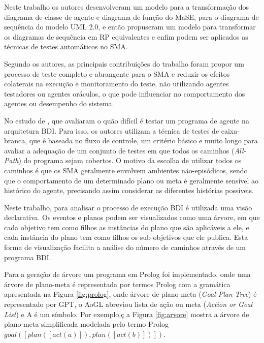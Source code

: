 Neste trabalho os autores desenvolveram um modelo para a transformação dos diagrama de classe de agente e diagrama de função do MaSE, para o diagrama de sequência do modelo UML 2.0, e então propuseram um modelo para transformar os diagramas de sequência em RP equivalentes e enfim podem ser aplicados as técnicas de testes automáticos no SMA.

Segundo os autores, as principais contribuições do trabalho foram propor um processo de teste completo e abrangente para o SMA e reduzir os efeitos colaterais na execução e monitoramento do teste, não utilizando agentes testadores ou agentes oráculos, o que pode influenciar no comportamento dos agentes ou desempenho do sistema.


No estudo de \cite{winikoff2014testability}, que avaliaram o quão difícil é testar um programa de agente na arquitetura BDI. Para isso, os autores utilizam a técnica de testes de caixa-branca, que é baseada no fluxo de controle, um critério básico e muito longo para avaliar a adequação de um conjunto de testes em que todos os caminhos (\textit{All-Path}) do programa sejam cobertos. O motivo da escolha de utilizar todos os caminhos é que os SMA geralmente envolvem ambientes não-episódicos, sendo que o comportamento de um determinado plano ou meta é geralmente sensível ao histórico do agente, precisando assim considerar as diferentes histórias possíveis.

Neste trabalho, para analisar o processo de execução BDI é utilizada uma visão declarativa. Os eventos e planos podem ser visualizados como uma árvore, em que cada objetivo tem como filhos as instâncias do plano que são aplicáveis a ele, e cada instância do plano tem como filhos os sub-objetivos que ele publica. Esta forma de visualização facilita a análise do número de caminhos através de um programa BDI.

Para a geração de árvore um programa em Prolog foi implementado, onde uma árvore de plano-meta é representada por termos Prolog com a gramática apresentada na Figura \ref{fig:prolog}, onde árvore de plano-meta (\textit{Goal-Plan Tree}) é representado por GPT, o AoGL abreviou lista de ação ou meta (\textit{Action or Goal List}) e A é um símbolo. Por exemplo,ç a Figura \ref{fig:arvore} mostra a árvore de plano-meta simplificada modelada pelo termo Prolog \begin{math} goal\left ( \left [ plan\left ( \left [ act\left ( a \right ) \right ] \right ),plan\left ( \left [ act\left ( b \right ) \right ] \right ) \right ] \right )\end{math}.

